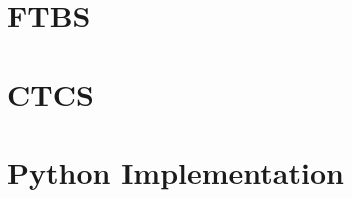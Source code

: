 \documentclass[12pt,mythesisstyle]{report}
\begin{document}
\afterpreface

\onehalfspacing



\chapter{FTBS}\label{chap:ftbs}


\chapter{CTCS}\label{chap:ctcs}


\chapter{Python Implementation}\label{chap:pythonimplementation}



\end{document}
